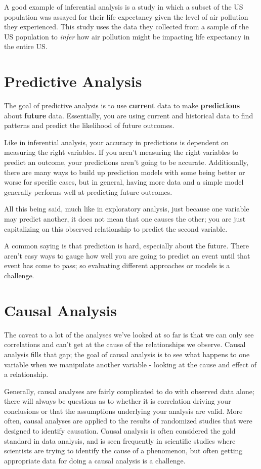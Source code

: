 \documentclass[10pt,a4paper,twoside]{article}\usepackage[]{graphicx}\usepackage[]{xcolor}
\begin{document}
A good example of inferential analysis is a study in which a subset of the US population was assayed for their life expectancy given the level of air pollution they experienced. This study uses the data they collected from a sample of the US population to \emph{infer} how air pollution might be impacting life expectancy in the entire US.

\section{Predictive Analysis}

The goal of predictive analysis is to use \textbf{current} data to make \textbf{predictions} about \textbf{future} data. Essentially, you are using current and historical data to find patterns and predict the likelihood of future outcomes.

Like in inferential analysis, your accuracy in predictions is dependent on measuring the right variables. If you aren't measuring the right variables to predict an outcome, your predictions aren't going to be accurate. Additionally, there are many ways to build up prediction models with some being better or worse for specific cases, but in general, having more data and a simple model generally performs well at predicting future outcomes.

All this being said, much like in exploratory analysis, just because one variable may predict another, it does not mean that one causes the other; you are just capitalizing on this observed relationship to predict the second variable.

A common saying is that prediction is hard, especially about the future. There aren’t easy ways to gauge how well you are going to predict an event until that event has come to pass; so evaluating different approaches or models is a challenge.

\section{Causal Analysis}

The caveat to a lot of the analyses we’ve looked at so far is that we can only see correlations and can’t get at the cause of the relationships we observe. Causal analysis fills that gap; the goal of causal analysis is to see what happens to one variable when we manipulate another variable - looking at the cause and effect of a relationship.

Generally, causal analyses are fairly complicated to do with observed data alone; there will always be questions as to whether it is correlation driving your conclusions or that the assumptions underlying your analysis are valid. More often, causal analyses are applied to the results of randomized studies that were designed to identify causation. Causal analysis is often considered the gold standard in data analysis, and is seen frequently in scientific studies where scientists are trying to identify the cause of a phenomenon, but often getting appropriate data for doing a causal analysis is a challenge.
\end{document}
